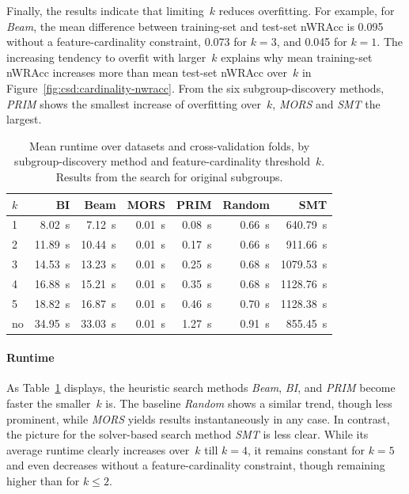 \documentclass{article}
\theoremstyle{definition}
\begin{document}
Finally, the results indicate that limiting~$k$ reduces overfitting.
For example, for \emph{Beam}, the mean difference between training-set and test-set nWRAcc is 0.095 without a feature-cardinality constraint, 0.073 for $k=3$, and 0.045 for $k=1$.
The increasing tendency to overfit with larger~$k$ explains why mean training-set nWRAcc increases more than mean test-set nWRAcc over~$k$ in Figure~\ref{fig:csd:cardinality-nwracc}.
From the six subgroup-discovery methods, \emph{PRIM} shows the smallest increase of overfitting over~$k$, \emph{MORS} and \emph{SMT} the largest.

\begin{table}[t]
	\centering
	\begin{tabular}{lrrrrrr}
		\toprule
		$k$ & BI & Beam & MORS & PRIM & Random & SMT \\
		\midrule
		1 & 8.02~s & 7.12~s & 0.01~s & 0.08~s & 0.66~s & 640.79~s \\
		2 & 11.89~s & 10.44~s & 0.01~s & 0.17~s & 0.66~s & 911.66~s \\
		3 & 14.53~s & 13.23~s & 0.01~s & 0.25~s & 0.68~s & 1079.53~s \\
		4 & 16.88~s & 15.21~s & 0.01~s & 0.35~s & 0.68~s & 1128.76~s \\
		5 & 18.82~s & 16.87~s & 0.01~s & 0.46~s & 0.70~s & 1128.38~s \\
		no & 34.95~s & 33.03~s & 0.01~s & 1.27~s & 0.91~s & 855.45~s \\
		\bottomrule
	\end{tabular}
	\caption{
		Mean runtime over datasets and cross-validation folds, by subgroup-discovery method and feature-cardinality threshold~$k$.
		Results from the search for original subgroups.
	}
	\label{tab:csd:cardinality-runtime}
\end{table}

\paragraph{Runtime}

As Table~\ref{tab:csd:cardinality-runtime} displays, the heuristic search methods \emph{Beam}, \emph{BI}, and \emph{PRIM} become faster the smaller~$k$ is.
The baseline \emph{Random} shows a similar trend, though less prominent, while \emph{MORS} yields results instantaneously in any case.
In contrast, the picture for the solver-based search method \emph{SMT} is less clear.
While its average runtime clearly increases over~$k$ till $k=4$, it remains constant for $k=5$ and even decreases without a feature-cardinality constraint, though remaining higher than for $k \leq 2$.
\end{document}
